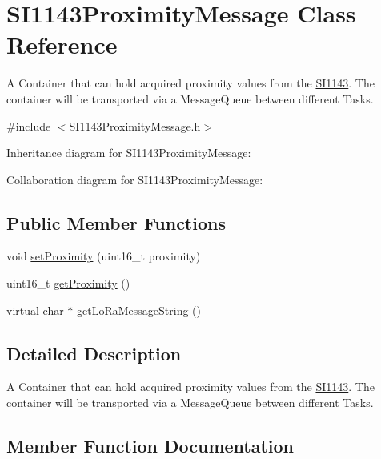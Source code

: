 \hypertarget{class_s_i1143_proximity_message}{}\section{S\+I1143\+Proximity\+Message Class Reference}
\label{class_s_i1143_proximity_message}


A Container that can hold acquired proximity values from the \hyperlink{class_s_i1143}{S\+I1143}. The container will be transported via a Message\+Queue between different Tasks.  




{\ttfamily \#include $<$S\+I1143\+Proximity\+Message.\+h$>$}



Inheritance diagram for S\+I1143\+Proximity\+Message\+:


Collaboration diagram for S\+I1143\+Proximity\+Message\+:
\subsection*{Public Member Functions}
\begin{DoxyCompactItemize}
\item 
void \hyperlink{class_s_i1143_proximity_message_aceb6655e055bebd12ba1085ca5caeae0}{set\+Proximity} (uint16\+\_\+t proximity)
\item 
uint16\+\_\+t \hyperlink{class_s_i1143_proximity_message_a44fe23ce784f1ce62a39110de2bb55ee}{get\+Proximity} ()
\item 
virtual char $\ast$ \hyperlink{class_s_i1143_proximity_message_a17ecf5362d65923d106d729103f67580}{get\+Lo\+Ra\+Message\+String} ()
\end{DoxyCompactItemize}


\subsection{Detailed Description}
A Container that can hold acquired proximity values from the \hyperlink{class_s_i1143}{S\+I1143}. The container will be transported via a Message\+Queue between different Tasks. 

\subsection{Member Function Documentation}
\hypertarget{class_s_i1143_proximity_message_a17ecf5362d65923d106d729103f67580}{}
